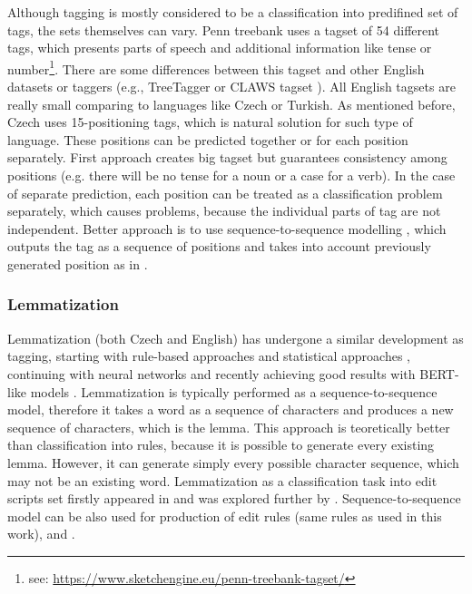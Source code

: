 Although tagging is mostly considered to be a classification into predifined set of tags, the sets themselves can vary. Penn treebank uses a tagset of 54 different tags, which presents parts of speech and additional information like tense or number\footnote{see: \url{https://www.sketchengine.eu/penn-treebank-tagset/}}. There are some differences between this tagset and other English datasets or taggers (e.g., TreeTagger \citep{Schmid95improvementsin} or CLAWS tagset \citep{Chapelle1988TheCA}). All English tagsets are really small comparing to languages like Czech or Turkish. As mentioned before, Czech uses 15-positioning tags, which is  natural solution for such type of language. These positions can be predicted together or for each position separately. First approach creates big tagset but guarantees consistency among positions (e.g. there will be no tense for a noun or a case for a verb). In the case of separate prediction, each position can be treated as a classification problem separately, which causes problems, because the individual parts of tag are not independent. Better approach is to use sequence-to-sequence modelling \citep{Sutskever2014}, which outputs the tag as a sequence of positions and takes into account previously generated position as in \citep{malaviya-etal-2019-simple}.

\subsubsection{Lemmatization}
Lemmatization (both Czech and English) has undergone a similar development as tagging, starting with rule-based approaches and statistical approaches \citep{Plisson}, continuing with neural networks and recently achieving good results with BERT-like models \citep{Kondratyuk2019}.  Lemmatization is typically performed as a sequence-to-sequence model, therefore it takes a word as a sequence of characters and produces a new sequence of characters, which is the lemma. This approach is teoretically better than classification into rules, because it is possible to generate every existing lemma. However, it can generate simply every possible character sequence, which may not be an existing word. Lemmatization as a classification task into edit scripts set firstly appeared in \citep{Chrupala} and was explored further by \citep{Straka2018}. 
Sequence-to-sequence model can be also used for production of edit rules (same rules as used in this work)\citep{chakrabarty2017context}, \citep{muller2015joint} and \citep{Yildiz2019}.

